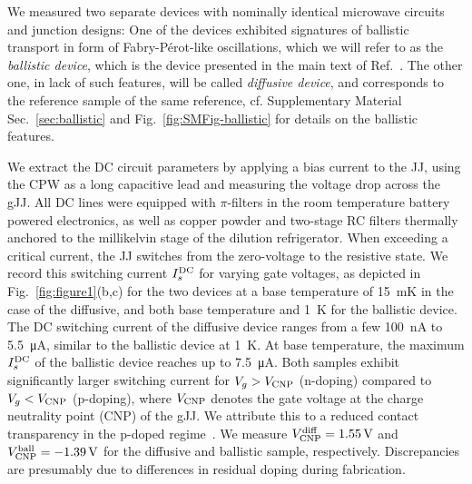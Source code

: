 We measured two separate devices with nominally identical microwave circuits and junction designs:
%
One of the devices exhibited signatures of ballistic transport in form of Fabry-Pérot-like oscillations, which we will refer to as the \textit{ballistic device}, which is the device presented in the main text of Ref.~\cite{schmidtBallisticGrapheneSuperconducting2018}.
%
The other one, in lack of such features, will be called \textit{diffusive device}, and corresponds to the reference sample of the same reference, cf. Supplementary Material Sec.~\ref{sec:ballistic} and Fig.~\ref{fig:SMFig-ballistic} for details on the ballistic features.

We extract the DC circuit parameters by applying a bias current to the JJ, using the CPW as a long capacitive lead and measuring the voltage drop across the gJJ.
%
All DC lines were equipped with $\pi$-filters in the room temperature battery powered electronics, as well as copper powder and two-stage RC filters thermally anchored to the millikelvin stage of the dilution refrigerator.
%
When exceeding a critical current, the JJ switches from the zero-voltage to the resistive state.
%
We record this switching current $I_s^{\rm DC}$ for varying gate voltages, as depicted in Fig.~\ref{fig:figure1}(b,c) for the two devices at a base temperature of \SI{15}{\milli\kelvin} in the case of the diffusive, and both base temperature and \SI{1}{\kelvin} for the ballistic device.
%
The DC switching current of the diffusive device ranges from a few \SI{100}{\nano\ampere} to \SI{5.5}{\micro\ampere}, similar to the ballistic device at \SI{1}{\kelvin}.
%
At base temperature, the maximum $I_s^{\rm DC}$ of the ballistic device reaches up to \SI{7.5}{\micro\ampere}.
%
Both samples exhibit significantly larger switching current for $V_g>V_{\rm CNP}$ (n-doping) compared to $V_g<V_{\rm CNP}$ (p-doping), where $V_{\rm CNP}$ denotes the gate voltage at the charge neutrality point (CNP) of the gJJ.
%
We attribute this to a reduced contact transparency in the p-doped regime~\cite{schmidtBallisticGrapheneSuperconducting2018}.
%
We measure $V_{\rm CNP}^{\rm diff}=\SI{1.55}{\volt}$ and $V_{\rm CNP}^{\rm ball}=\SI{-1.39}{\volt}$ for the diffusive and ballistic sample, respectively.
%
Discrepancies are presumably due to differences in residual doping during fabrication.

